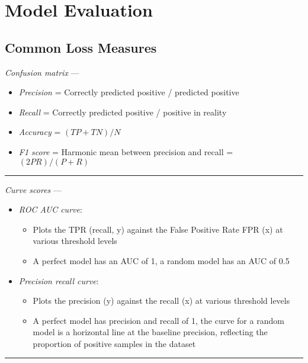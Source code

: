 \section{Model Evaluation}
\subsection*{Common Loss Measures}
\emph{Confusion matrix} --- 
\begin{itemize}
    \item \emph{Precision} = Correctly predicted positive / predicted positive
    \item \emph{Recall} = Correctly predicted positive / positive in reality
    \item \emph{Accuracy} = $(TP + TN) / N$
    \item \emph{F1 score} = Harmonic mean between precision and recall = $(2PR)/(P+R)$
\end{itemize}

{\color{lightgray}\hrule height 0.001mm}

\emph{Curve scores} --- 
\begin{itemize}
    \item \emph{ROC AUC curve}: 
    \begin{itemize}
        \item Plots the TPR (recall, y) against the False Positive Rate FPR (x) at various threshold levels
        \item A perfect model has an AUC of 1, a random model has an AUC of 0.5
    \end{itemize}
    \item \emph{Precision recall curve}:
    \begin{itemize}
        \item Plots the precision (y) against the recall (x) at various threshold levels
        \item A perfect model has precision and recall of 1, the curve for a random model is a horizontal line at the baseline precision, reflecting the proportion of positive samples in the dataset
    \end{itemize}
\end{itemize}

{\color{lightgray}\hrule height 0.001mm}


